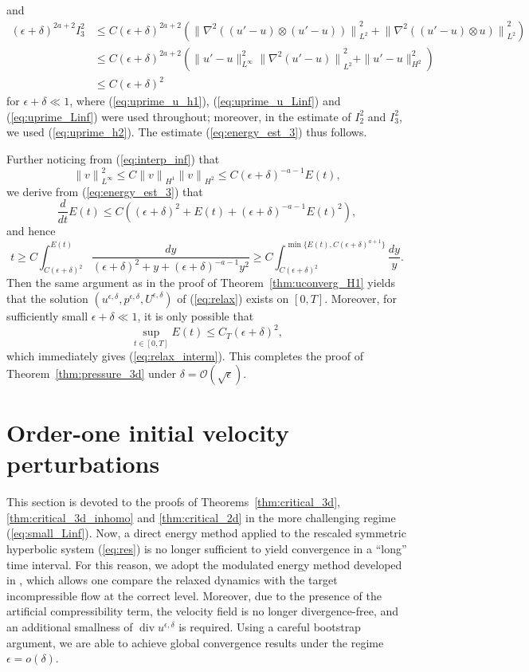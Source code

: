 \documentclass[reqno,10pt]{amsart}
\theoremstyle{definition}
\theoremstyle{remark}
\numberwithin{equation}{section}
\DeclareMathOperator{\dive}{div}
\begin{document}
and
\[
\begin{aligned}
    (\epsilon+\delta)^{2a+2}I^2_3 &\le C (\epsilon+\delta)^{2a+2} \left( {\| \nabla^2\left( (u'-u)\otimes (u'-u) \right)\|}_{L^2}^2 + {\| \nabla^2\left( (u'-u)\otimes u \right)\|}_{L^2}^2 \right) \\
    &\le C (\epsilon+\delta)^{2a+2} \left({\|u'-u\|_{L^\infty}^2 \| \nabla^2(u'-u)\|}_{L^2}^2 + \|u'-u\|_{H^2}^2 \right) \\
    & \le C(\epsilon+\delta)^2
\end{aligned}
\]
for $\epsilon+\delta\ll 1$, where (\ref{eq:uprime_u_h1}), (\ref{eq:uprime_u_Linf}) and (\ref{eq:uprime_Linf}) were used throughout; moreover, in the estimate of $I^2_2$ and $I^2_3$, we used (\ref{eq:uprime_h2}). The estimate (\ref{eq:energy_est_3}) thus follows.

Further noticing from (\ref{eq:interp_inf}) that
\[ {\|v\|}_{L^\infty}^2 \le C {\|v\|}_{H^1} {\|v\|}_{H^2} \le C(\epsilon+\delta)^{-a-1}E(t), \]
we derive from (\ref{eq:energy_est_3}) that
\[
    \frac{d}{dt}E(t) \le C\left( (\epsilon+\delta)^2 + E(t) + (\epsilon+\delta)^{-a-1}E(t)^2 \right),
\]
and hence
\[
    t \ge C\int_{C(\epsilon+\delta)^2}^{E(t)} \frac{dy}{(\epsilon+\delta)^2+y+(\epsilon+\delta)^{-a-1}y^2} 
    \ge C\int_{C(\epsilon+\delta)^2}^{\min\{E(t),C(\epsilon+\delta)^{a+1}\}} \frac{dy}{y}.
\]
Then the same argument as in the proof of Theorem~\ref{thm:uconverg_H1} yields that the solution $(u^{\epsilon,\delta},p^{\epsilon,\delta},U^{\epsilon,\delta})$ of (\ref{eq:relax}) exists on $[0,T]$. Moreover, for sufficiently small $\epsilon+\delta\ll 1$, it is only possible that
\[
    \sup_{t\in[0,T]} E(t) \le C_T(\epsilon+\delta)^2,
\]
which immediately gives (\ref{eq:relax_interm}). This completes the proof of Theorem~\ref{thm:pressure_3d} under $\delta=\mathcal O(\sqrt\epsilon)$. 

\section{Order-one initial velocity perturbations} \label{sec:large}

This section is devoted to the proofs of Theorems~\ref{thm:critical_3d}, \ref{thm:critical_3d_inhomo} and \ref{thm:critical_2d} in the more challenging regime (\ref{eq:small_Linf}). Now, a direct energy method applied to the rescaled symmetric hyperbolic system (\ref{eq:res}) is no longer sufficient to yield convergence in a ``long'' time interval. For this reason, we adopt the modulated energy method developed in \cite{Brenier2003}, which allows one compare the relaxed dynamics with the target incompressible flow at the correct level. Moreover, due to the presence of the artificial compressibility term, the velocity field is no longer divergence-free, and an additional smallness of $\dive u^{\epsilon,\delta}$ is required. Using a careful bootstrap argument, we are able to achieve global convergence results under the regime $\epsilon=o(\delta)$.
\end{document}
